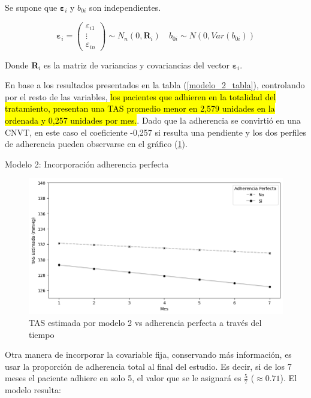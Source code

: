 \documentclass[spanish]{article}
\numberwithin{figure}{subsection}
\numberwithin{equation}{subsection}
\numberwithin{table}{subsection}
\begin{document}
Se supone que $\bm{\varepsilon}_i$ y $b_{0i}$ son independientes.

\[ 
	\bm{\varepsilon}_i = \begin{pmatrix} \varepsilon_{i1} \\ \vdots \\ \varepsilon_{in} \end{pmatrix} \sim N_{n}(0, \bm{R}_i)
	\quad
	b_{0i} \sim N(0, Var(b_{0i}))
\]

Donde $\bm{R}_i$ es la matriz de variancias y covariancias del vector
$\bm{\varepsilon}_i$.

En base a los resultados presentados en la tabla (\ref{modelo_2_tabla}),
controlando por el resto de las variables, \hl{los pacientes que adhieren en la
totalidad del tratamiento, presentan una TAS promedio menor en 2,579 unidades en
la ordenada y 0,257 unidades por mes.}. Dado que la adherencia se convirtió en
una CNVT, en este caso el coeficiente -0,257 si resulta una pendiente y los dos
perfiles de adherencia pueden observarse en el gráfico (\ref{modelo_2_plot}).

\begin{table}[H]
	\centering
	\caption{Modelo 2: Incorporación adherencia perfecta}
	\label{modelo_2_tabla}
	
\end{table}

\begin{figure}[H]
	\centering
	\includegraphics[scale=0.5]{img/modelo_2.png}
	\caption{TAS estimada por modelo 2 vs adherencia perfecta a través del tiempo}
	\label{modelo_2_plot}
\end{figure}

Otra manera de incorporar la covariable fija, conservando más información, es
usar la proporción de adherencia total al final del estudio. Es decir, si de los
7 meses el paciente adhiere en solo 5, el valor que se le asignará es
$\frac{5}{7}$ ($\approx 0.71$). El modelo resulta:
\end{document}
